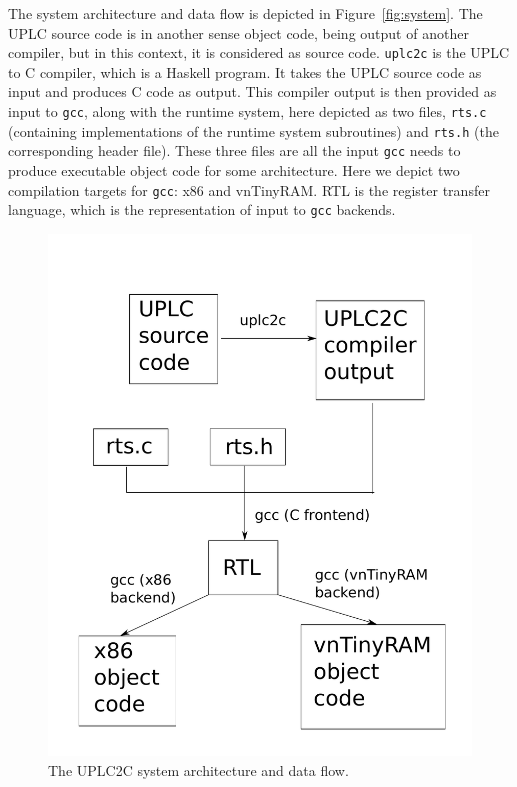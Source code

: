 \documentclass[12pt]{article}
\begin{document}
The system architecture and data flow is depicted in Figure~\ref{fig:system}. The UPLC source code is in another sense object code, being output of another compiler, but in this context, it is considered as source code. \texttt{uplc2c} is the UPLC to C compiler, which is a Haskell program. It takes the UPLC source code as input and produces C code as output. This compiler output is then provided as input to \texttt{gcc}, along with the runtime system, here depicted as two files, \texttt{rts.c} (containing implementations of the runtime system subroutines) and \texttt{rts.h} (the corresponding header file). These three files are all the input \texttt{gcc} needs to produce executable object code for some architecture. Here we depict two compilation targets for \texttt{gcc}: x86 and vnTinyRAM. RTL is the register transfer language, which is the representation of input to \texttt{gcc} backends. \cite{rtl}

\begin{figure}
	\includegraphics[width=1.0\columnwidth]{system-and-process-diagram.pdf}
	\caption{The UPLC2C system architecture and data flow.}
\end{figure}
\end{document}
